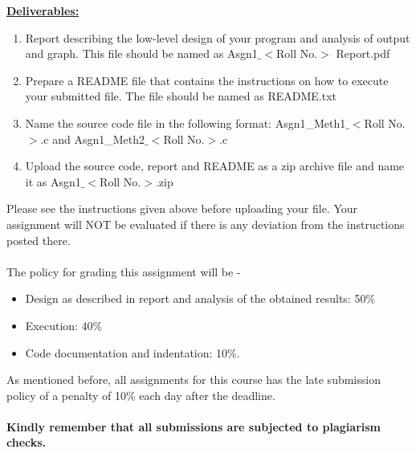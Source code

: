 \documentclass{article}
\begin{document}
\noindent\textbf{\underline {Deliverables: }}
\begin{enumerate}
    \item Report describing the low-level design of your program and analysis of output and graph. This file should be named as Asgn1$\_<$Roll No.$>$ Report.pdf
    \item Prepare a README file that contains the instructions on how to execute your submitted file. The file should be named as README.txt
    \item Name the source code file in the following format: Asgn1\_Meth1$\_<$Roll No.$>$.c and Asgn1\_Meth2$\_<$Roll No.$>$.c
    \item Upload the source code, report and README as a zip archive file and name it as Asgn1$\_<$Roll No.$>$.zip
    
\end{enumerate}
Please see the instructions given above before uploading your file. Your assignment will NOT be evaluated if there is any deviation from the instructions posted there.\\
\\
The policy for grading this assignment will be -\\
\begin{itemize}
    \item Design as described in report and analysis of the obtained results: 50\%
    \item Execution: 40\%
    \item Code documentation and indentation: 10\%.
\end{itemize}
As mentioned before, all assignments for this course has the late submission policy of a penalty of 10\% each day after the deadline.\\\\
\textbf{Kindly remember that all submissions are subjected to plagiarism checks.}
\end{document}
